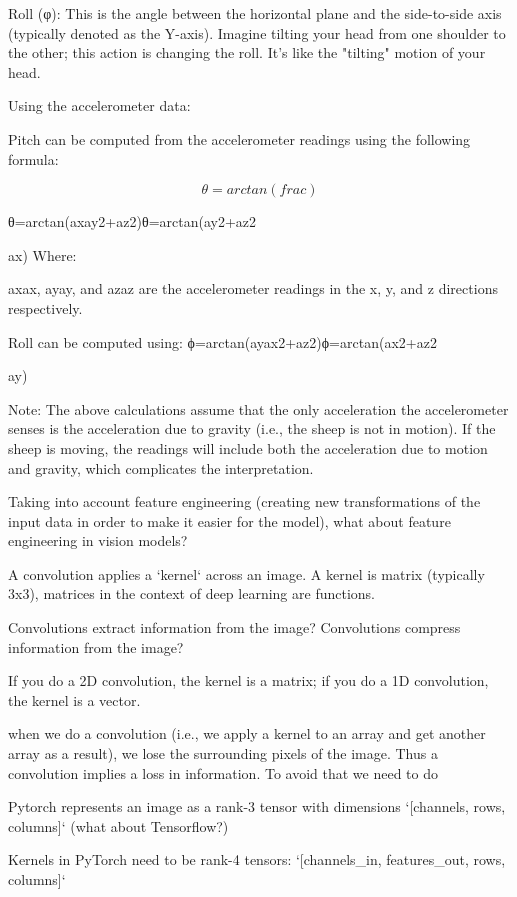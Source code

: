     Roll (φ): This is the angle between the horizontal plane and the side-to-side axis (typically 
    denoted as the Y-axis). Imagine tilting your head from one shoulder to the other; this 
    action is changing the roll. It's like the "tilting" motion of your head.

Using the accelerometer data:

Pitch can be computed from the accelerometer readings using the following formula:

$$
\theta = arctan(frac)
$$


θ=arctan⁡(axay2+az2)θ=arctan(ay2​+az2​

​ax​​)
Where:

axax​, ayay​, and azaz​ are the accelerometer readings in the x, y, and z directions respectively.

Roll can be computed using:
ϕ=arctan⁡(ayax2+az2)ϕ=arctan(ax2​+az2​

​ay​​)

Note: The above calculations assume that the only acceleration the accelerometer senses is the acceleration due to gravity (i.e., the sheep is not in motion). If the sheep is moving, the readings will include both the acceleration due to motion and gravity, which complicates the interpretation.




Taking into account feature engineering (creating new transformations of the input data in order
to make it easier for the model), what about feature engineering in vision models?




A convolution applies a `kernel` across an image. A kernel is matrix (typically 3x3), matrices in the context of deep learning are 
functions. 


Convolutions extract information from the image?
Convolutions compress information from the image?

If you do a 2D convolution, the kernel is a matrix; if you do a 1D convolution, the kernel is a vector. 


when we do a convolution (i.e., we apply a kernel to an array and get another array as a result), we lose the surrounding pixels
of the image. Thus a convolution implies a loss in information. To avoid that we need to do 



Pytorch represents an image as a rank-3 tensor with dimensions `[channels, rows, columns]` (what about Tensorflow?)


Kernels in PyTorch need to be rank-4 tensors: 
`[channels_in, features_out, rows, columns]`


